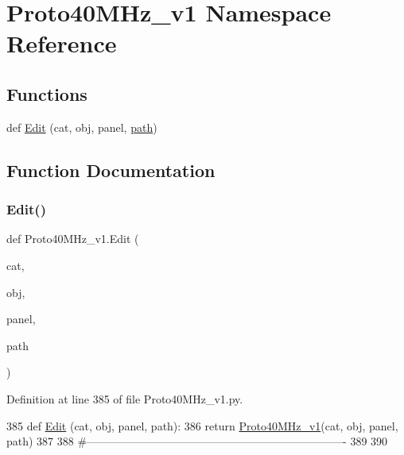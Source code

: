 \hypertarget{namespaceProto40MHz__v1}{}\section{Proto40\+M\+Hz\+\_\+v1 Namespace Reference}
\label{namespaceProto40MHz__v1}
\subsection*{Functions}
\begin{DoxyCompactItemize}
\item 
def \hyperlink{namespaceProto40MHz__v1_a107cd78ad5d8e7d51ecfb3a94bf77587}{Edit} (cat, obj, panel, \hyperlink{classHierarchy_aa7990fa7caf132d83e361ce033c6c65a}{path})
\end{DoxyCompactItemize}


\subsection{Function Documentation}
\mbox{\label{namespaceProto40MHz__v1_a107cd78ad5d8e7d51ecfb3a94bf77587}} 
\subsubsection{\texorpdfstring{Edit()}{Edit()}}
{\footnotesize\ttfamily def Proto40\+M\+Hz\+\_\+v1.\+Edit (\begin{DoxyParamCaption}\item[{}]{cat,  }\item[{}]{obj,  }\item[{}]{panel,  }\item[{}]{path }\end{DoxyParamCaption})}



Definition at line 385 of file Proto40\+M\+Hz\+\_\+v1.\+py.


\begin{DoxyCode}
385 \textcolor{keyword}{def }\hyperlink{namespaceProto40MHz__v1_a107cd78ad5d8e7d51ecfb3a94bf77587}{Edit} (cat, obj, panel, path):
386     \textcolor{keywordflow}{return} \hyperlink{classProto40MHz__v1}{Proto40MHz\_v1}(cat, obj, panel, path)
387 
388 \textcolor{comment}{#----------------------------------------------------------------------}
389 
390 \end{DoxyCode}
